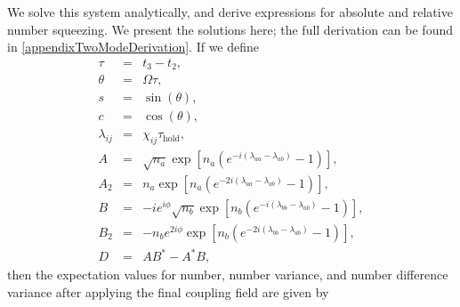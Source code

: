 \documentclass{iopart}
\begin{document}
We solve this system analytically, and derive expressions for absolute and relative number squeezing. We present the solutions here; the full derivation can be found in \ref{appendixTwoModeDerivation}. If we define
\begin{eqnarray}
\tau &=& t_3 - t_2, \\
\theta &=& \Omega \tau, \\
s &=& \sin(\theta), \label{eqsDef} \\
c &=& \cos(\theta), \\
\lambda_{ij} &=& \chi_{ij} \tau_{\mathrm{hold}}, \\
A &=& \sqrt{n_a} \exp [n_a (e^{-i(\lambda_{aa}-\lambda_{ab})} - 1 )], \\
A_2 &=& n_a \exp [n_a (e^{-2i(\lambda_{aa}-\lambda_{ab})} - 1 )], \\
B &=& -i e^{i \phi}\sqrt{n_b} \exp [n_b (e^{-i(\lambda_{bb}-\lambda_{ab})} - 1 )], \\
B_2 &=& -n_b e^{2i\phi} \exp [n_b (e^{-2i(\lambda_{bb}-\lambda_{ab})} - 1 )], \\
D &=& AB^* - A^*B, \label{eqDDef}
\end{eqnarray}
then the expectation values for number, number variance, and number difference variance after applying the final coupling field are given by
\end{document}
